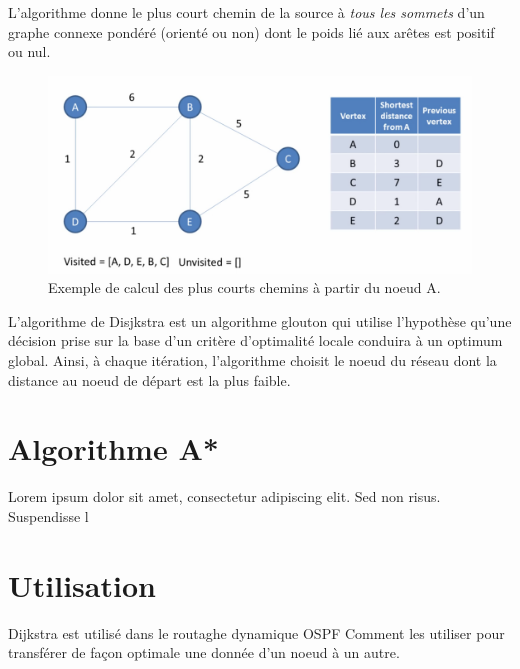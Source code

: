 L'algorithme donne le plus court chemin de la source à \textit{tous les sommets} d'un graphe 
connexe pondéré (orienté ou non) dont le poids lié aux arêtes est positif ou nul.



 


\begin{figure}[htp]
  \centering
  \includegraphics[width=15cm]{images/algo_dij}
  \caption{Exemple de calcul des plus courts chemins à partir du noeud A.}
  \label{fig:une-autre-image}
\end{figure}

L'algorithme de Disjkstra est un algorithme glouton qui utilise l'hypothèse qu'une décision prise sur la base
d'un critère d'optimalité locale conduira à un optimum global. Ainsi, à chaque itération, l'algorithme choisit le noeud
du réseau dont la distance au noeud de départ est la plus faible.
%   

\section{Algorithme A*}
Lorem ipsum dolor sit amet, consectetur adipiscing elit. Sed non risus. Suspendisse l
\section{Utilisation}

Dijkstra est utilisé dans le routaghe dynamique OSPF
Comment les utiliser pour transférer de façon optimale une donnée d'un noeud à un autre. 

